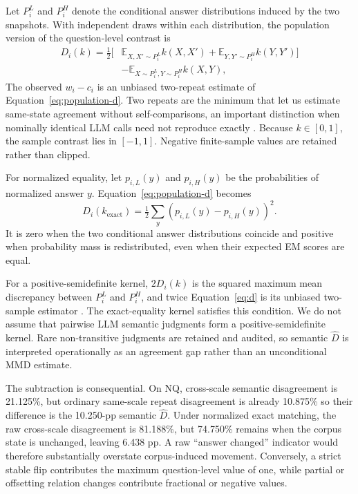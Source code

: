 \documentclass[sigconf,nonacm]{acmart}
\newcommand{\Dhat}{\widehat{D}}
\begin{document}
Let $P_i^L$ and $P_i^H$ denote the conditional answer distributions induced by the two snapshots.  With independent draws within each distribution, the population version of the question-level contrast is
\begin{equation}
 \begin{aligned}
 D_i(k)=\tfrac{1}{2}\big[&\mathbb{E}_{X,X'\sim P_i^L}k(X,X')+
 \mathbb{E}_{Y,Y'\sim P_i^H}k(Y,Y')\big]\\
 &-\mathbb{E}_{X\sim P_i^L,Y\sim P_i^H}k(X,Y),
 \end{aligned}
 \label{eq:population-d}
\end{equation}
The observed $w_i-c_i$ is an unbiased two-repeat estimate of Equation~\ref{eq:population-d}. Two repeats are the minimum that let us estimate same-state agreement without self-comparisons, an important distinction when nominally identical LLM calls need not reproduce exactly \cite{atil2025nondeterminism}. Because $k\in[0,1]$, the sample contrast lies in $[-1,1]$. Negative finite-sample values are retained rather than clipped.

For normalized equality, let $p_{i,L}(y)$ and $p_{i,H}(y)$ be the probabilities of normalized answer $y$.  Equation~\ref{eq:population-d} becomes
\begin{equation}
 D_i(k_{\mathrm{exact}})=\tfrac{1}{2}\sum_y
       \left(p_{i,L}(y)-p_{i,H}(y)\right)^2.
 \label{eq:exact-population}
\end{equation}
It is zero when the two conditional answer distributions coincide and positive when probability mass is redistributed, even when their expected EM scores are equal.

For a positive-semidefinite kernel, $2D_i(k)$ is the squared maximum mean discrepancy between $P_i^L$ and $P_i^H$, and twice Equation~\ref{eq:d} is its unbiased two-sample estimator \cite{gretton2012mmd}. The exact-equality kernel satisfies this condition. We do not assume that pairwise LLM semantic judgments form a positive-semidefinite kernel. Rare non-transitive judgments are retained and audited, so semantic $\Dhat$ is interpreted operationally as an agreement gap rather than an unconditional MMD estimate.

The subtraction is consequential.  On NQ, cross-scale semantic disagreement is 21.125\%, but ordinary same-scale repeat disagreement is already 10.875\% so their difference is the 10.250-pp semantic $\Dhat$.  Under normalized exact matching, the raw cross-scale disagreement is 81.188\%, but 74.750\% remains when the corpus state is unchanged, leaving 6.438 pp.  A raw ``answer changed'' indicator would therefore substantially overstate corpus-induced movement. Conversely, a strict stable flip contributes the maximum question-level value of one, while partial or offsetting relation changes contribute fractional or negative values.
\end{document}
